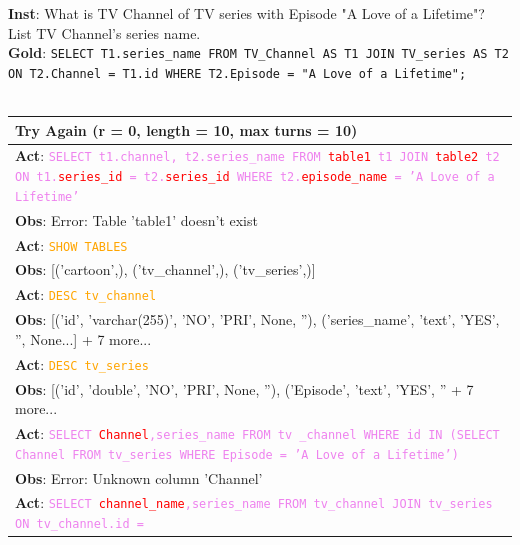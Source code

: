 \begin{table}
\footnotesize
\textbf{Inst}: What is TV Channel of TV series with Episode "A Love of a Lifetime"? List TV Channel's series name. \\
\textbf{Gold}: \texttt{SELECT T1.series\_name FROM TV\_Channel AS T1 JOIN TV\_series AS T2 ON T2.Channel = T1.id WHERE T2.Episode = "A Love of a Lifetime";} \\
\\
\begin{minipage}[t]{.49\linewidth}
\begin{tabularx}{\textwidth}{X}
\toprule
\textbf{Try Again} (r = 0, length = 10, max turns = 10) \\
\midrule
\textbf{Act}: \texttt{\textcolor{violet}{SELECT t1.channel, t2.series\_name FROM \textcolor{red}{table1} t1 JOIN \textcolor{red}{table2} t2 ON t1.\textcolor{red}{series\_id} = 
t2.\textcolor{red}{series\_id} WHERE t2.\textcolor{red}{episode\_name} = 'A Love of a Lifetime'}} \\
\textbf{Obs}: Error: Table 'table1' doesn't exist \\
\textbf{Act}: \textcolor{orange}{\texttt{SHOW TABLES}} \\
\textbf{Obs}: [('cartoon',), ('tv\_channel',), ('tv\_series',)] \\
\textbf{Act}: \textcolor{orange}{\texttt{DESC tv\_channel}} \\
\textbf{Obs}: [('id', 'varchar(255)', 'NO', 'PRI', None, ''), ('series\_name', 'text', 'YES', '', None...] + 7 
more... \\
\textbf{Act}: \textcolor{orange}{\texttt{DESC tv\_series}} \\
\textbf{Obs}: [('id', 'double', 'NO', 'PRI', None, ''), ('Episode', 'text', 'YES', '' + 7 more... \\
\textbf{Act}: \texttt{\textcolor{violet}{SELECT \textcolor{red}{Channel},series\_name FROM tv \_channel WHERE id IN (SELECT Channel FROM tv\_series 
WHERE Episode = 'A Love of a Lifetime')}} \\
\textbf{Obs}: Error: Unknown column 'Channel' \\
\textbf{Act}: \textcolor{violet}{\texttt{SELECT \textcolor{red}{channel\_name},series\_name FROM tv\_channel JOIN tv\_series ON tv\_channel.id = 
}}
\end{tabularx}
\end{minipage}
\end{table}
